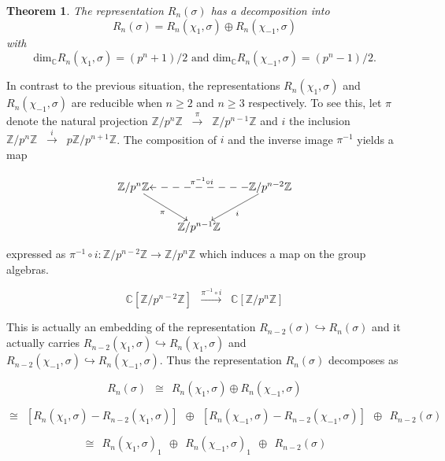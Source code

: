 \documentclass[12pt,reqno]{amsart}
\newtheorem{theorem}{Theorem}[section]
\theoremstyle{remark}
\numberwithin{table}{section}
\newcommand{\C}{\mathbb C}
\newcommand{\Z}{\mathbb Z}
\begin{document}
\begin{theorem}
The representation  $R_n(\sigma)$  has a decomposition into 
$$R_n(\sigma) = R_n(\chi_1, \sigma) \oplus R_n(\chi_{-1}, \sigma)$$
with 
$${\text{dim}}_{\C} R_n(\chi_1, \sigma) = (p^n+1)/2  {\text{ and  }} {\text{dim}}_{\C} R_n(\chi_{-1}, \sigma) = (p^n-1)/2.$$
\end{theorem}


In contrast to the previous situation, the representations $R_n(\chi_1, \sigma)$ and $R_n(\chi_{-1}, \sigma)$  are reducible when $n \geq 2$ and $n \geq 3$ respectively.    To see this, let $\pi$ denote the natural projection $\Z/p^n\Z  \;\; {\overset{\pi }{ \longrightarrow}} \;\;  \Z/p^{n-1}\Z $ and $i$ the inclusion $\Z/p^n\Z  \;\; {\overset{i }{ \longrightarrow}} \;\;  p\Z/p^{n+1}\Z $. The composition of $i$ and the inverse image $\pi^{-1}$ yields a map 

\[ \xymatrix@1{ \Z/p^{n}\Z  \ar[dr]_{\pi} & & \ar@{-->}[ll]_{\pi^{-1}\circ i} \ar[dl]^{i} \Z/p^{n-2}\Z \\ & \Z/p^{n-1}\Z & }\]

\noindent expressed as $\pi^{-1}\circ i : \Z/p^{n-2}\Z \to  \Z/p^{n}\Z$ which induces a map on the group algebras.

\[ \C[\Z/p^{n-2}\Z]  \;\; {\overset{\pi^{-1}\circ i}{ \longrightarrow}} \;\; \C[\Z/p^{n}\Z] \]



This is actually an embedding of the representation $R_{n-2}(\sigma) \hookrightarrow R_{n}(\sigma)$ and it actually carries $R_{n-2}(\chi_1,\sigma) \hookrightarrow R_{n}(\chi_1, \sigma)$ and $R_{n-2}(\chi_{-1},\sigma) \hookrightarrow R_{n}(\chi_{-1}, \sigma)$. Thus the representation $R_n(\sigma)$ decomposes as 

\[ R_n(\sigma) \: \;  \cong \: \: R_{n}(\chi_1, \sigma) \oplus R_{n}(\chi_{-1}, \sigma)\]

\[  \cong  \: \: \left [ R_{n}(\chi_1, \sigma) - R_{n-2}(\chi_1, \sigma) \right ] \: \: \oplus \: \:  \left [ R_{n}(\chi_{-1}, \sigma) - R_{n-2}(\chi_{-1}, \sigma) \right ] \: \: \oplus \: \: R_{n-2}(\sigma) \]

\[  \cong  \: \: R_{n}(\chi_1, \sigma)_1 \: \: \oplus \: \:   R_{n}(\chi_{-1}, \sigma)_1 \: \: \oplus \: \: R_{n-2}(\sigma) \]
\end{document}
